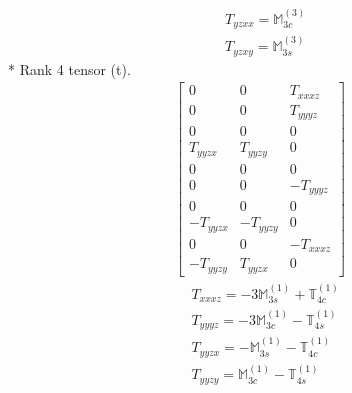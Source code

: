 \documentclass[fleqn,8pt,landscape]{jsarticle}
\begin{document}
\begin{align*}
& T_{yzxx} = \mathbb{M}_{3c}^{(3)} \\
& T_{yzxy} = \mathbb{M}_{3s}^{(3)}
\end{align*}
* Rank 4 tensor (t).
\begin{align*}
\begin{bmatrix} 0 & 0 & T_{xxxz} \\ 0 & 0 & T_{yyyz} \\ 0 & 0 & 0 \\ T_{yyzx} & T_{yyzy} & 0 \\ 0 & 0 & 0 \\ 0 & 0 & - T_{yyyz} \\ 0 & 0 & 0 \\ - T_{yyzx} & - T_{yyzy} & 0 \\ 0 & 0 & - T_{xxxz} \\ - T_{yyzy} & T_{yyzx} & 0 \end{bmatrix}
\end{align*}
\begin{align*}
& T_{xxxz} = - 3 \mathbb{M}_{3s}^{(1)} + \mathbb{T}_{4c}^{(1)} \\
& T_{yyyz} = - 3 \mathbb{M}_{3c}^{(1)} - \mathbb{T}_{4s}^{(1)} \\
& T_{yyzx} = - \mathbb{M}_{3s}^{(1)} - \mathbb{T}_{4c}^{(1)} \\
& T_{yyzy} = \mathbb{M}_{3c}^{(1)} - \mathbb{T}_{4s}^{(1)}
\end{align*}
\end{document}
